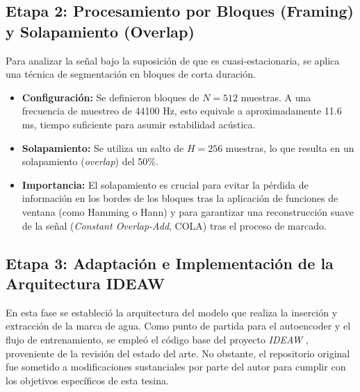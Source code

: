 \subsection{Etapa 2: Procesamiento por Bloques (Framing) y Solapamiento (Overlap)}
\label{sec:etapa2_framing}

Para analizar la señal bajo la suposición de que es cuasi-estacionaria, se aplica una técnica de segmentación en bloques de corta duración.

\begin{itemize}
    \item \textbf{Configuración:} Se definieron bloques de $N = 512$ muestras. A una frecuencia de muestreo de 44100 Hz, esto equivale a aproximadamente 11.6 ms, tiempo suficiente para asumir estabilidad acústica.
    \item \textbf{Solapamiento:} Se utiliza un salto de $H = 256$ muestras, lo que resulta en un solapamiento (\textit{overlap}) del 50\%.
    \item \textbf{Importancia:} El solapamiento es crucial para evitar la pérdida de información en los bordes de los bloques tras la aplicación de funciones de ventana (como Hamming o Hann) y para garantizar una reconstrucción suave de la señal (\textit{Constant Overlap-Add}, COLA) tras el proceso de marcado.
\end{itemize}

\subsection{Etapa 3: Adaptación e Implementación de la Arquitectura IDEAW}
\label{sec:etapa3_diseno_red}

En esta fase se estableció la arquitectura del modelo que realiza la inserción y extracción de la marca de agua. Como punto de partida para el autoencoder y el flujo de entrenamiento, se empleó el código base del proyecto \textit{IDEAW} \cite{li2024ideaw}, proveniente de la revisión del estado del arte. No obstante, el repositorio original fue sometido a modificaciones sustanciales por parte del autor para cumplir con los objetivos específicos de esta tesina.

